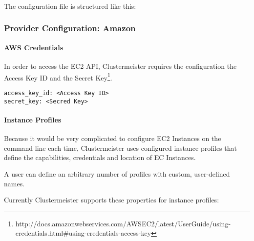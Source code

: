\documentclass{article}
\begin{document}
The configuration file is structured like this:



\subsubsection{Provider Configuration: Amazon}

\paragraph{AWS Credentials}

In order to access the EC2 API, Clustermeister requires the configuration the Access Key ID and the Secret Key\footnote{http://docs.amazonwebservices.com/AWSEC2/latest/UserGuide/using-credentials.html\#using-credentials-access-key}.

\begin{lstlisting}[breaklines=true, frame=single]
access_key_id: <Access Key ID> 
secret_key: <Secred Key>
\end{lstlisting}

\paragraph{Instance Profiles}

Because it would be very complicated to configure EC2 Instances on the command line each time, Clustermeister uses configured instance profiles that define the capabilities, credentials and location of EC Instances.

A user can define an arbitrary number of profiles with custom, user-defined names.

Currently Clustermeister supports these properties for instance profiles:
\end{document}

